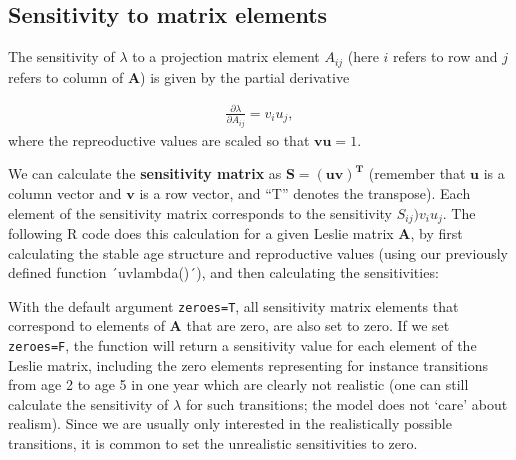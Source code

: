 \documentclass[
]{book}
\newenvironment{Shaded}{\begin{snugshade}}{\end{snugshade}}
\newcommand{\AttributeTok}[1]{\textcolor[rgb]{0.77,0.63,0.00}{#1}}
\newcommand{\ControlFlowTok}[1]{\textcolor[rgb]{0.13,0.29,0.53}{\textbf{#1}}}
\newcommand{\DecValTok}[1]{\textcolor[rgb]{0.00,0.00,0.81}{#1}}
\newcommand{\FunctionTok}[1]{\textcolor[rgb]{0.00,0.00,0.00}{#1}}
\newcommand{\NormalTok}[1]{#1}
\newcommand{\OtherTok}[1]{\textcolor[rgb]{0.56,0.35,0.01}{#1}}
\newcommand{\SpecialCharTok}[1]{\textcolor[rgb]{0.00,0.00,0.00}{#1}}
\begin{document}
\hypertarget{sensitivity-to-matrix-elements}{%
\subsection{Sensitivity to matrix elements}\label{sensitivity-to-matrix-elements}}

The sensitivity of \(\lambda\) to a projection matrix element \(A_{ij}\) (here \(i\) refers to row and \(j\) refers to column of \(\mathbf{A}\)) is given by the partial derivative

\begin{align} 
\frac{\partial  \lambda}{\partial A_{ij}}=v_{i}u_{j},
\end{align}
where the repreoductive values are scaled so that \(\mathbf{vu}=1\).

We can calculate the \textbf{sensitivity matrix} as \(\mathbf{S}=\mathbf{(uv)^T}\) (remember that \(\mathbf{u}\) is a column vector and \(\mathbf{v}\) is a row vector, and ``T'' denotes the transpose). Each element of the sensitivity matrix corresponds to the sensitivity \(S_{ij})v_{i}u_{j}\). The following R code does this calculation for a given Leslie matrix \(\mathbf{A}\), by first calculating the stable age structure and reproductive values (using our previously defined function ´uvlambda()´), and then calculating the sensitivities:

\begin{Shaded}
\end{Shaded}

With the default argument \texttt{zeroes=T}, all sensitivity matrix elements that correspond to elements of \(\mathbf{A}\) that are zero, are also set to zero. If we set \texttt{zeroes=F}, the function will return a sensitivity value for each element of the Leslie matrix, including the zero elements representing for instance transitions from age 2 to age 5 in one year which are clearly not realistic (one can still calculate the sensitivity of \(\lambda\) for such transitions; the model does not `care' about realism). Since we are usually only interested in the realistically possible transitions, it is common to set the unrealistic sensitivities to zero.
\end{document}
